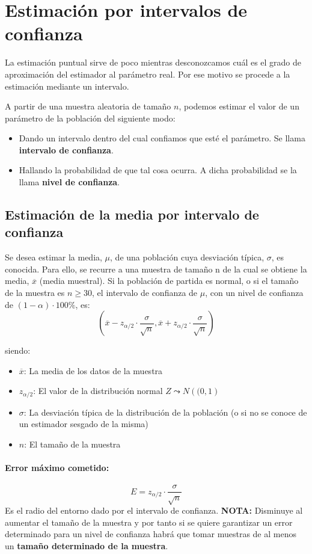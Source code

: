 \section{Estimación por intervalos de confianza}

La estimación puntual sirve de poco mientras
desconozcamos cuál es el grado de aproximación del estimador al parámetro real. Por ese motivo se procede
a la estimación mediante un intervalo.

A partir de una muestra aleatoria de tamaño $n$, podemos estimar el valor de un parámetro de la población del siguiente modo:
 
\begin{itemize}
\item Dando un intervalo dentro del cual confiamos que esté el parámetro. Se llama \textbf{intervalo de confianza}.
\item Hallando la probabilidad de que tal cosa ocurra. A dicha probabilidad se la llama \textbf{nivel de confianza}.
\end{itemize}


\subsection{Estimación de la media por intervalo de confianza} Se desea estimar la media, $\mu$, de una población cuya desviación típica, $\sigma$, es
conocida.
Para ello, se recurre a una muestra de tamaño n de la cual se obtiene la media,
$\overline{x}$ (media muestral).
Si la población de partida es normal, o si el tamaño de la muestra es $n \geqslant 30 $, el intervalo de confianza de $\mu$, con un nivel de confianza de $\left( 1 - \alpha \right)\cdot 100 \% $, es: $$ \left( \overline{x} - z_{\alpha / 2}\cdot \frac{\sigma}{\sqrt{n}} ,  \overline{x} + z_{\alpha / 2}\cdot \frac{\sigma}{\sqrt{n}}
\right)$$

siendo: \begin{itemize}
\item $\overline{x}$: La media de los datos de la muestra
\item $z_{\alpha / 2}$: El valor de la distribución normal $Z\leadsto N\left((0,1\right)$
\item $\sigma$: La desviación típica de la distribución de la población (o si no se conoce de un estimador sesgado de la misma)
\item $n$: El tamaño de la muestra
\end{itemize}

\paragraph{Error máximo cometido:} $$E=z_{\alpha / 2}\cdot \frac{\sigma}{\sqrt{n}}$$
Es el radio del entorno dado por el intervalo de confianza. \textbf{NOTA:} Disminuye al aumentar el tamaño de la muestra y por tanto si se quiere garantizar un error determinado para un nivel de confianza habrá que tomar muestras de al menos un \textbf{tamaño determinado de la muestra}. 

